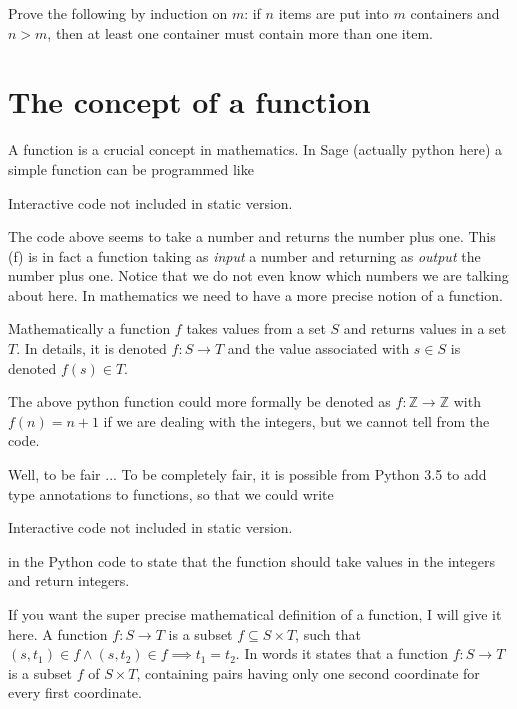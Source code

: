 \begin{exercise}
  Prove the following by induction on $m$: if $n$ items are put into $m$ containers and
  $n > m$, then at least one container must contain more than one item.
\end{exercise}

\section{The concept of a function}

A function is a crucial concept in mathematics. In Sage (actually python here) a simple function can be
programmed like

\begin{sage} Interactive code not included in static version.\end{sage}

The code above seems to take a number and returns the number plus one. This (f) is in fact a function
taking as \emph{input} a number and returning as \emph{output} the number plus one. Notice that
we do not even know which numbers we are talking about here. In mathematics we need to have
a more precise notion of a function.

Mathematically a function $f$ takes values from a set $S$ and returns values in a set $T$. In details,
it is denoted $f: S\rightarrow T$ and the value associated with $s\in S$ is denoted $f(s)\in T$.

The above python function could more formally be denoted as $f: \mathbb{Z}\rightarrow \mathbb{Z}$ with
$f(n) = n+1$ if we are dealing with the integers, but we cannot tell from the code.

\begin{button}{Well, to be fair ...}
  To be completely fair, it is possible from Python 3.5 to add type annotations to functions, so that we could write
  \begin{sage} Interactive code not included in static version.\end{sage}
  in the Python code to state that the function should take values in the integers and return integers.
\end{button}

If you want the  super precise mathematical definition of a function, I
will give it here.  A function $f: S\rightarrow T$ is a subset
$f\subseteq S\times T$, such that
$(s, t_1)\in f \land (s, t_2)\in f \implies t_1 = t_2$. In words it states that a
function $f: S\rightarrow T$ is a subset $f$ of $S\times T$, containing pairs
having only one second coordinate for every first coordinate.

